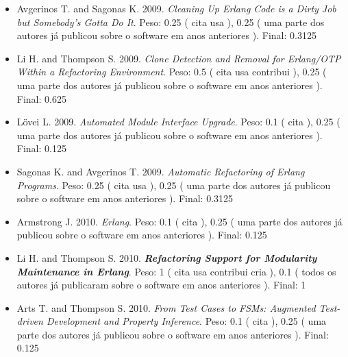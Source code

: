 \begin{itemize}
\item Avgerinos T. and Sagonas K.
      2009.
        \textit{ Cleaning Up Erlang Code is a Dirty Job but Somebody's Gotta Do It}.
      Peso:
      0.25 (
          cita
          usa
      ),
      0.25 (
uma parte dos autores já publicou sobre o software em anos anteriores
      ).
      Final:
      0.3125

\item Li H. and Thompson S.
      2009.
        \textit{ Clone Detection and Removal for Erlang/OTP Within a Refactoring Environment}.
      Peso:
      0.5 (
          cita
          usa
          contribui
      ),
      0.25 (
uma parte dos autores já publicou sobre o software em anos anteriores
      ).
      Final:
      0.625

\item L\"{o}vei L.
      2009.
        \textit{ Automated Module Interface Upgrade}.
      Peso:
      0.1 (
          cita
      ),
      0.25 (
uma parte dos autores já publicou sobre o software em anos anteriores
      ).
      Final:
      0.125

\item Sagonas K. and Avgerinos T.
      2009.
        \textit{ Automatic Refactoring of Erlang Programs}.
      Peso:
      0.25 (
          cita
          usa
      ),
      0.25 (
uma parte dos autores já publicou sobre o software em anos anteriores
      ).
      Final:
      0.3125

\item Armstrong J.
      2010.
        \textit{ Erlang}.
      Peso:
      0.1 (
          cita
      ),
      0.25 (
uma parte dos autores já publicou sobre o software em anos anteriores
      ).
      Final:
      0.125

\item Li H. and Thompson S.
      2010.
        \textbf{\textit{ Refactoring Support for Modularity Maintenance in Erlang}}.
      Peso:
      1 (
          cita
          usa
          contribui
          cria
      ),
      0.1 (
todos os autores já publicaram sobre o software em anos anteriores
      ).
      Final:
      1

\item Arts T. and Thompson S.
      2010.
        \textit{ From Test Cases to FSMs: Augmented Test-driven Development and Property Inference}.
      Peso:
      0.1 (
          cita
      ),
      0.25 (
uma parte dos autores já publicou sobre o software em anos anteriores
      ).
      Final:
      0.125


\end{itemize}
